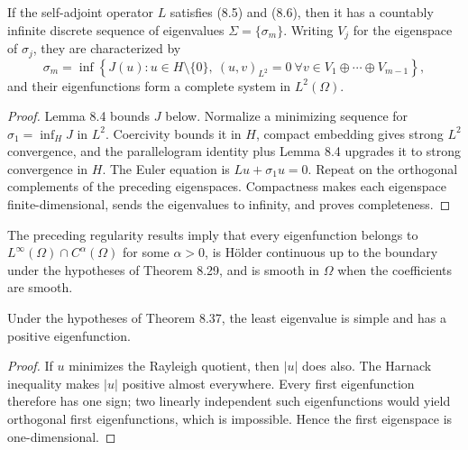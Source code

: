 \begin{theorem}
\label{gt-thm-8-37-variational-spectrum}
If the self-adjoint operator $L$ satisfies (8.5) and (8.6), then it has a
countably infinite discrete sequence of eigenvalues $\Sigma=\{\sigma_m\}$.
Writing $V_j$ for the eigenspace of $\sigma_j$, they are characterized by
\begin{equation}
\sigma_m=\inf\left\{J(u):u\in H\setminus\{0\},\
(u,v)_{L^2}=0\ \forall v\in V_1\oplus\cdots\oplus V_{m-1}\right\},
\tag{8.94}
\end{equation}
and their eigenfunctions form a complete system in $L^2(\Omega)$.
\end{theorem}
\begin{proof}
\sketch Lemma 8.4 bounds $J$ below. Normalize a minimizing sequence for
$\sigma_1=\inf_HJ$ in $L^2$. Coercivity bounds it in $H$, compact embedding
gives strong $L^2$ convergence, and the parallelogram identity plus Lemma 8.4
upgrades it to strong convergence in $H$. The Euler equation is
$Lu+\sigma_1u=0$. Repeat on the orthogonal complements of the preceding
eigenspaces. Compactness makes each eigenspace finite-dimensional, sends the
eigenvalues to infinity, and proves completeness.
\end{proof}

\begin{remark}
\label{gt-rem-8-eigenfunction-regularity}
The preceding regularity results imply that every eigenfunction belongs to
$L^\infty(\Omega)\cap C^\alpha(\Omega)$ for some $\alpha>0$, is H\"older
continuous up to the boundary under the hypotheses of Theorem 8.29, and is
smooth in $\Omega$ when the coefficients are smooth.
\end{remark}

\begin{theorem}
\label{gt-thm-8-38-simple-positive-first-eigenfunction}
Under the hypotheses of Theorem 8.37, the least eigenvalue is simple and has a
positive eigenfunction.
\end{theorem}
\begin{proof}
\sketch If $u$ minimizes the Rayleigh quotient, then $|u|$ does also. The Harnack
inequality makes $|u|$ positive almost everywhere. Every first eigenfunction
therefore has one sign; two linearly independent such eigenfunctions would yield
orthogonal first eigenfunctions, which is impossible. Hence the first eigenspace
is one-dimensional.
\end{proof}


